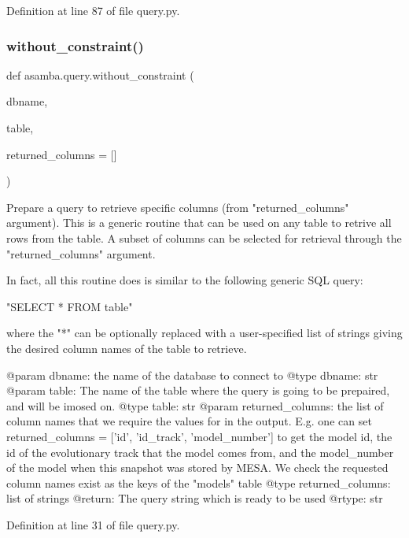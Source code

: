 Definition at line 87 of file query.\+py.

\mbox{\label{namespaceasamba_1_1query_a64b71fbea43ff349dc4d813f35ffa459}} 
\subsubsection{\texorpdfstring{without\+\_\+constraint()}{without\_constraint()}}
{\footnotesize\ttfamily def asamba.\+query.\+without\+\_\+constraint (\begin{DoxyParamCaption}\item[{}]{dbname,  }\item[{}]{table,  }\item[{}]{returned\+\_\+columns = {\ttfamily \mbox{[}\mbox{]}} }\end{DoxyParamCaption})}

\begin{DoxyVerb}Prepare a query to retrieve specific columns (from "returned_columns" argument). This is a generic
routine that can be used on any table to retrive all rows from the table. A subset of columns can 
be selected for retrieval through the "returned_columns" argument. 

In fact, all this routine does is similar to the following generic SQL query:

  "SELECT * FROM table"

where the "*" can be optionally replaced with a user-specified list of strings giving the desired
column names of the table to retrieve.

@param dbname: the name of the database to connect to
@type dbname: str
@param table: The name of the table where the query is going to be prepaired, and will be imosed on.
@type table: str
@param returned_columns: the list of column names that we require the values for in the output.
       E.g. one can set returned_columns = ['id', 'id_track', 'model_number'] to get the model id,
       the id of the evolutionary track that the model comes from, and the model_number of the model
       when this snapshot was stored by MESA. We check the requested column names exist as the 
       keys of the "models" table
@type returned_columns: list of strings
@return: The query string which is ready to be used
@rtype: str
\end{DoxyVerb}
 

Definition at line 31 of file query.\+py.

